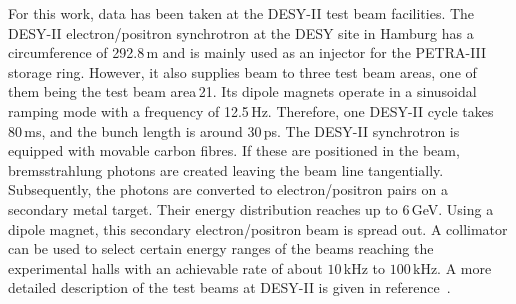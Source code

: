 
For this work, data has been taken at the {DESY-II} test beam facilities. 
The DESY-II electron/positron synchrotron at the DESY site in Hamburg has a circumference of 292.8\,m and is mainly used as an injector for the PETRA-III storage ring. 
However, it also supplies beam to three test beam areas, one  of them being the test beam area\,21.
Its dipole magnets operate in a sinusoidal ramping mode with a frequency of 12.5\,Hz. 
Therefore, one DESY-II cycle takes 80\,ms, and the bunch length is around 30\,ps. 
The DESY-II synchrotron is equipped with movable carbon fibres. 
If these are positioned in the beam, bremsstrahlung photons are created leaving the beam line tangentially.
Subsequently, the photons are converted to electron/positron pairs on a secondary metal target. 
Their energy distribution reaches up to 6\,GeV. 
Using a dipole magnet, this secondary electron/positron beam is spread out.
A collimator can be used to select certain energy ranges of the beams reaching the experimental halls with an achievable rate of about $10$\,kHz to $100$\,kHz. 
A more detailed description of the test beams at {DESY-II} is given in reference~\cite{EUDET-2007-11}.



